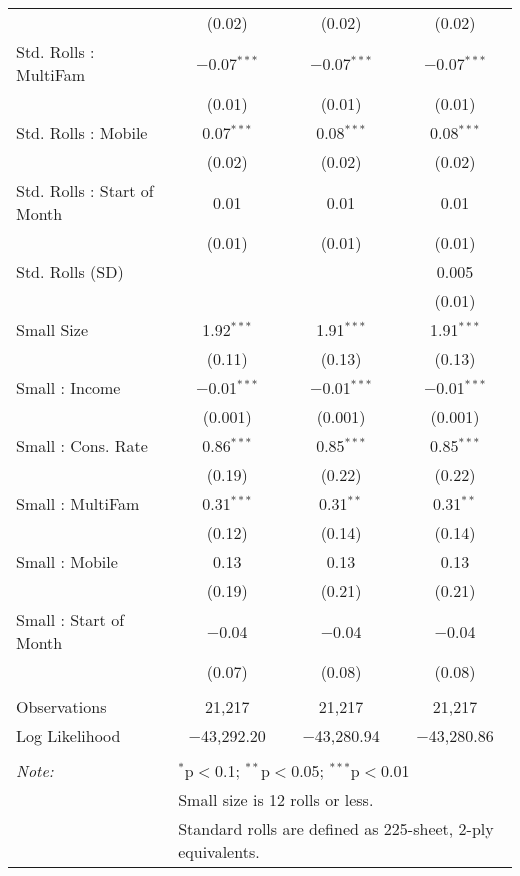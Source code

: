 \begin{table}[!htbp]
\begin{tabular}{@{\extracolsep{5pt}}lccc}
  & (0.02) & (0.02) & (0.02) \\ 
  Std. Rolls : MultiFam & $-$0.07$^{***}$ & $-$0.07$^{***}$ & $-$0.07$^{***}$ \\ 
  & (0.01) & (0.01) & (0.01) \\ 
  Std. Rolls : Mobile & 0.07$^{***}$ & 0.08$^{***}$ & 0.08$^{***}$ \\ 
  & (0.02) & (0.02) & (0.02) \\ 
  Std. Rolls : Start of Month & 0.01 & 0.01 & 0.01 \\ 
  & (0.01) & (0.01) & (0.01) \\ 
  Std. Rolls (SD) &  &  & 0.005 \\ 
  &  &  & (0.01) \\ 
  Small Size & 1.92$^{***}$ & 1.91$^{***}$ & 1.91$^{***}$ \\ 
  & (0.11) & (0.13) & (0.13) \\ 
  Small : Income & $-$0.01$^{***}$ & $-$0.01$^{***}$ & $-$0.01$^{***}$ \\ 
  & (0.001) & (0.001) & (0.001) \\ 
  Small : Cons. Rate & 0.86$^{***}$ & 0.85$^{***}$ & 0.85$^{***}$ \\ 
  & (0.19) & (0.22) & (0.22) \\ 
  Small : MultiFam & 0.31$^{***}$ & 0.31$^{**}$ & 0.31$^{**}$ \\ 
  & (0.12) & (0.14) & (0.14) \\ 
  Small : Mobile & 0.13 & 0.13 & 0.13 \\ 
  & (0.19) & (0.21) & (0.21) \\ 
  Small : Start of Month & $-$0.04 & $-$0.04 & $-$0.04 \\ 
  & (0.07) & (0.08) & (0.08) \\ 
 \hline \\[-1.8ex] 
Observations & 21,217 & 21,217 & 21,217 \\ 
Log Likelihood & $-$43,292.20 & $-$43,280.94 & $-$43,280.86 \\ 
\hline 
\hline \\[-1.8ex] 
\textit{Note:}  & \multicolumn{3}{l}{$^{*}$p$<$0.1; $^{**}$p$<$0.05; $^{***}$p$<$0.01} \\ 
 & \multicolumn{3}{l}{Small size is 12 rolls or less.} \\ 
 & \multicolumn{3}{l}{Standard rolls are defined as 225-sheet, 2-ply equivalents.} \\ 
\end{tabular} 
\end{table} 
